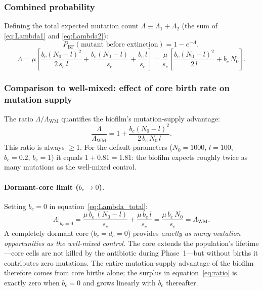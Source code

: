 \documentclass[12pt]{article}
\newcommand{\Nzero}{N_0}
\newcommand{\sEdge}{s_e}
\newcommand{\bEdge}{b_e}
\newcommand{\bCore}{b_c}
\newcommand{\dCore}{d_c}
\begin{document}
\subsubsection*{Combined probability}

Defining the total expected mutation count
$\Lambda \equiv \Lambda_1 + \Lambda_2$ (the sum of
\eqref{eq:Lambda1} and \eqref{eq:Lambda2}):
\begin{equation}
    \boxed{P_{\text{BF}}(\text{mutant before extinction})
    = 1 - e^{-\Lambda},}
    \label{eq:p_bf}
\end{equation}
\begin{equation}
    \Lambda = \mu\left[
        \frac{\bCore(\Nzero - l)^2}{2\,\sEdge\, l}
        + \frac{\bEdge(\Nzero - l)}{\sEdge}
        + \frac{\bEdge\, l}{\sEdge}
    \right]
    = \frac{\mu}{\sEdge}\left[
        \frac{\bCore(\Nzero - l)^2}{2\,l}
        + \bEdge\, \Nzero
    \right].
    \label{eq:Lambda_total}
\end{equation}

\subsubsection*{Comparison to well-mixed: effect of core birth rate on mutation supply}

The ratio $\Lambda / \Lambda_{\text{WM}}$ quantifies the biofilm's
mutation-supply advantage:
\begin{equation}
    \frac{\Lambda}{\Lambda_{\text{WM}}}
    = 1 + \frac{\bCore(\Nzero - l)^2}{2\, \bEdge\, \Nzero\, l}.
    \label{eq:ratio}
\end{equation}
This ratio is always $\geq 1$. For the default parameters ($\Nzero = 1000$,
$l = 100$, $\bCore = 0.2$, $\bEdge = 1$) it equals $1 + 0.81 = 1.81$: the biofilm
expects roughly twice as many mutations as the well-mixed control.

\paragraph{Dormant-core limit ($\bCore \to 0$).}
Setting $\bCore = 0$ in equation~\eqref{eq:Lambda_total}:
\begin{equation}
    \Lambda\big|_{\bCore=0}
    = \frac{\mu\,\bEdge\,(\Nzero - l)}{\sEdge}
      + \frac{\mu\,\bEdge\,l}{\sEdge}
    = \frac{\mu\,\bEdge\,\Nzero}{\sEdge}
    = \Lambda_{\text{WM}}.
    \label{eq:dormant_limit}
\end{equation}
A completely dormant core ($\bCore = \dCore = 0$) provides \emph{exactly as
many mutation opportunities as the well-mixed control.} The core extends the
population's lifetime---core cells are not killed by the antibiotic during
Phase~1---but without births it contributes zero mutations. The entire
mutation-supply advantage of the biofilm therefore comes from core births
alone; the surplus in equation~\eqref{eq:ratio} is exactly zero when
$\bCore = 0$ and grows linearly with $\bCore$ thereafter.
\end{document}
